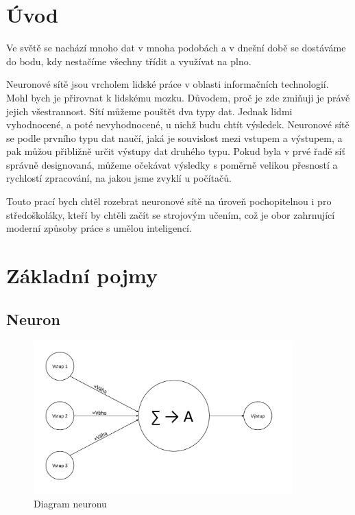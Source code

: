\documentclass[12pt,a4paper]{report}
\begin{document}


\tableofcontents

\chapter{Úvod}
Ve světě se nachází mnoho dat v mnoha podobách a v dnešní době se dostáváme do bodu, kdy nestačíme všechny třídit a využívat na plno.

Neuronové sítě jsou vrcholem lidské práce v oblasti informačních technologií. Mohl bych je přirovnat k lidskému mozku. Důvodem, proč je zde zmiňuji je právě jejich všestrannost. Sítí můžeme pouštět dva typy dat. Jednak lidmi vyhodnocené, a poté nevyhodnocené, u nichž budu chtít výsledek. Neuronové sítě se podle prvního typu dat naučí, jaká je souvislost mezi vstupem a výstupem, a pak můžou přibližně určit výstupy dat druhého typu. Pokud byla v prvé řadě síť správně designovaná, můžeme očekávat výsledky s poměrně velikou přesností a rychlostí zpracování, na jakou jsme zvyklí u počítačů.

Touto prací bych chtěl rozebrat neuronové sítě na úroveň pochopitelnou i pro středoškoláky, kteří by chtěli začít se strojovým učením, což je obor zahrnující moderní způsoby práce s umělou inteligencí.

\chapter{Základní pojmy} %

\section{Neuron}
	\begin{figure}[h]
		\centering
		\includegraphics[width=10cm]{images/neuron}
		\caption{Diagram neuronu}
	\end{figure}
\end{document}
